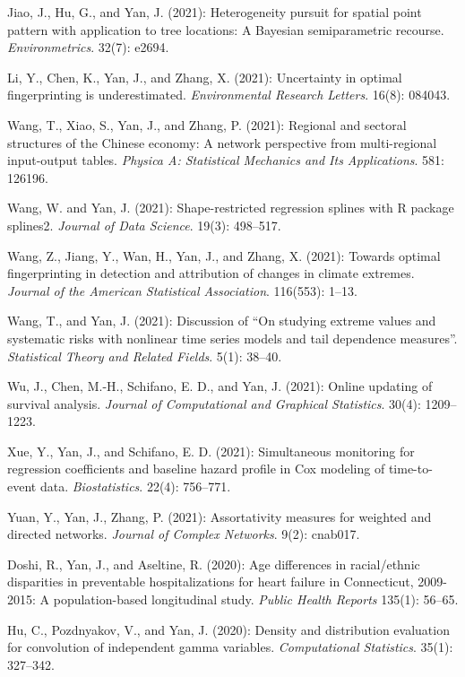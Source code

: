 \documentclass[Statistics]{vita}
\begin{document}
\begin{vita}
\begin{Publications}
\begin{RefereedJournalArticles}
  \item *Jiao, J., Hu, G., and Yan, J. (2021): Heterogeneity pursuit for spatial point pattern with application to tree locations: A Bayesian semiparametric recourse. {\em Environmetrics\/}. 32(7): e2694.
  \item *Li, Y., Chen, K., Yan, J., and Zhang, X. (2021): Uncertainty in optimal fingerprinting is underestimated. {\em Environmental Research Letters\/}. 16(8): 084043.
  \item *Wang, T., Xiao, S., Yan, J., and Zhang, P. (2021): Regional and sectoral structures of the Chinese economy: A network perspective from multi-regional input-output tables. {\em Physica A: Statistical Mechanics and Its Applications\/}. 581: 126196.
  \item *Wang, W. and Yan, J. (2021): Shape-restricted regression splines with R package splines2. {\em Journal of Data Science\/}. 19(3): 498--517.
  \item *Wang, Z., Jiang, Y., Wan, H., Yan, J., and Zhang, X. (2021): Towards optimal fingerprinting in detection and attribution of changes in climate extremes. {\em Journal of the American Statistical Association\/}. 116(553): 1--13.
  \item Wang, T., and Yan, J. (2021): Discussion of ``On studying extreme values and systematic risks with nonlinear time series models and tail dependence measures''. {\em Statistical Theory and Related Fields\/}. 5(1): 38--40.
  \item *Wu, J., Chen, M.-H., Schifano, E. D., and Yan, J. (2021): Online updating of survival analysis. {\em Journal of Computational and Graphical Statistics\/}. 30(4): 1209--1223.
  \item *Xue, Y., Yan, J., and Schifano, E. D. (2021): Simultaneous monitoring for regression coefficients and baseline hazard profile in Cox modeling of time-to-event data. {\em Biostatistics\/}. 22(4): 756--771.
  \item *Yuan, Y., Yan, J., Zhang, P. (2021): Assortativity measures for weighted and directed networks. {\em Journal of Complex Networks\/}. 9(2): cnab017. 
  \item *Doshi, R., Yan, J., and Aseltine, R. (2020): Age differences in racial/ethnic disparities in preventable hospitalizations for heart failure in Connecticut, 2009-2015: A population-based longitudinal study. {\em Public Health Reports\/} 135(1): 56--65.
  \item *Hu, C., Pozdnyakov, V., and Yan, J. (2020): Density and distribution evaluation for convolution of independent gamma variables. {\em Computational Statistics\/}. 35(1): 327--342.

\end{RefereedJournalArticles}
\end{Publications}
\end{vita}
\end{document}

